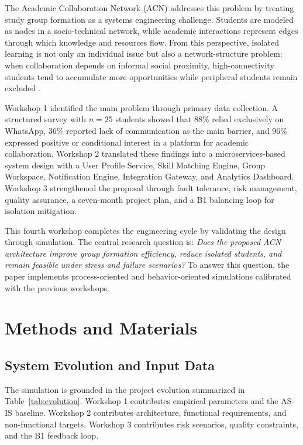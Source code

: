 \documentclass[conference]{IEEEtran}
\begin{document}
The Academic Collaboration Network (ACN) addresses this problem by treating study group formation as a systems engineering challenge. Students are modeled as nodes in a socio-technical network, while academic interactions represent edges through which knowledge and resources flow. From this perspective, isolated learning is not only an individual issue but also a network-structure problem: when collaboration depends on informal social proximity, high-connectivity students tend to accumulate more opportunities while peripheral students remain excluded \cite{wasserman1994,newman2010}.

Workshop 1 identified the main problem through primary data collection. A structured survey with $n=25$ students showed that 88\% relied exclusively on WhatsApp, 36\% reported lack of communication as the main barrier, and 96\% expressed positive or conditional interest in a platform for academic collaboration. Workshop 2 translated these findings into a microservices-based system design with a User Profile Service, Skill Matching Engine, Group Workspace, Notification Engine, Integration Gateway, and Analytics Dashboard. Workshop 3 strengthened the proposal through fault tolerance, risk management, quality assurance, a seven-month project plan, and a B1 balancing loop for isolation mitigation.

This fourth workshop completes the engineering cycle by validating the design through simulation. The central research question is: \emph{Does the proposed ACN architecture improve group formation efficiency, reduce isolated students, and remain feasible under stress and failure scenarios?} To answer this question, the paper implements process-oriented and behavior-oriented simulations calibrated with the previous workshops.

\section{Methods and Materials}

\subsection{System Evolution and Input Data}

The simulation is grounded in the project evolution summarized in Table~\ref{tab:evolution}. Workshop 1 contributes empirical parameters and the AS-IS baseline. Workshop 2 contributes architecture, functional requirements, and non-functional targets. Workshop 3 contributes risk scenarios, quality constraints, and the B1 feedback loop.
\end{document}
